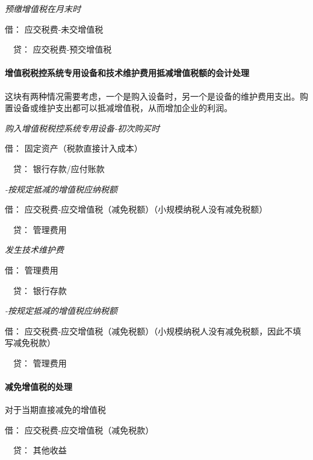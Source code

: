 \documentclass[UTF8,12pt]{ctexart}
\newenvironment{Dr}{\noindent 借：}{\par}
\newenvironment{Cr}{\noindent \ \ 贷：}{\par}
\numberwithin{equation}{section} %
\numberwithin{figure}{section}
\numberwithin{table}{section}
\begin{document}
	\textit{预缴增值税在月末时}
	
	\begin{Dr}
		应交税费-未交增值税
	\end{Dr}
	\begin{Cr}
		应交税费-预交增值税
	\end{Cr}

	\paragraph{增值税税控系统专用设备和技术维护费用抵减增值税额的会计处理}
	这块有两种情况需要考虑，一个是购入设备时，另一个是设备的维护费用支出。购置设备或维护支出都可以抵减增值税，从而增加企业的利润。
	
	\textit{购入增值税税控系统专用设备-初次购买时}
	
	\begin{Dr}
		固定资产（税款直接计入成本）
	\end{Dr}
	\begin{Cr}
		银行存款/应付账款
	\end{Cr}

	\textit{-按规定抵减的增值税应纳税额}
	
	\begin{Dr}
		应交税费-应交增值税（减免税额）（小规模纳税人没有减免税额）
	\end{Dr}
	\begin{Cr}
		管理费用
	\end{Cr}

	\textit{发生技术维护费}

	\begin{Dr}
		管理费用
	\end{Dr}
	\begin{Cr}
		银行存款
	\end{Cr}

	\textit{-按规定抵减的增值税应纳税额}
	
	\begin{Dr}
		应交税费-应交增值税（减免税额）（小规模纳税人没有减免税额，因此不填写减免税款）
	\end{Dr}
	\begin{Cr}
		管理费用
	\end{Cr}

	\paragraph{减免增值税的处理}
	对于当期直接减免的增值税
	
	\begin{Dr}
		应交税费-应交增值税（减免税款）
	\end{Dr}
	\begin{Cr}
		其他收益
	\end{Cr}
\end{document}
